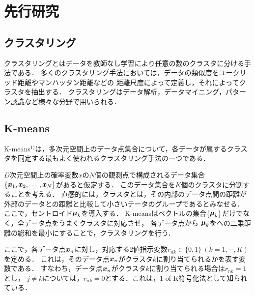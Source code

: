 \section{先行研究}

\subsection{クラスタリング}
クラスタリングとはデータを教師なし学習により任意の数のクラスタに分ける手法である．
多くのクラスタリング手法においては，データの類似度をユークリッド距離やマンハッタン距離などの
距離尺度によって定義し，それによってクラスタを抽出する．
クラスタリングはデータ解析，データマイニング，パターン認識など様々な分野で用いられる．

\subsection{K-means}
K-means$^{1)}$は，多次元空間上のデータ点集合について，各データが属するクラスタを同定する最もよく使われるクラスタリング手法の一つである．

$D$次元空間上の確率変数$x$の$N$個の観測点で構成されるデータ集合
$\{\mathop{\bm{x}}_1, \mathop{\bm{x}}_2, \cdots, \mathop{\bm{x}}_N\}$があると仮定する．
このデータ集合を$K$個のクラスタに分割することを考える．
直感的には，クラスタとは，その内部のデータ点間の距離が外部のデータとの距離と比較して小さいテータのグループであるとみなせる．
ここで，セントロイド$\mathop{\bm{\mu}}_k$を導入する．
K-meansはベクトルの集合$\{\mathop{\bm{\mu}}_k\}$だけでなく，全データ点をうまくクラスタに対応させ，
各データ点から $\mathop{\bm{\mu}}_k$をへの二乗距離の総和を最小にすることで，クラスタリングを行う．

ここで，各データ点$\mathop{\bm{x}}_n$に対し，対応する2値指示変数$r_{nk} \in \{0, 1\}\ (k = 1, \cdots, K)$を定める．
これは，そのデータ点$\mathop{\bm{x}}_n$がクラスタ$k$に割り当てられるかを表す変数である．
すなわち，データ点$\mathop{\bm{x}}_n$がクラスタ$k$に割り当てられる場合は$r_{nk}=1$とし，
$j \not= k$については，$r_{nk}=0$とする．これは，1-of-K符号化法として知られている．


